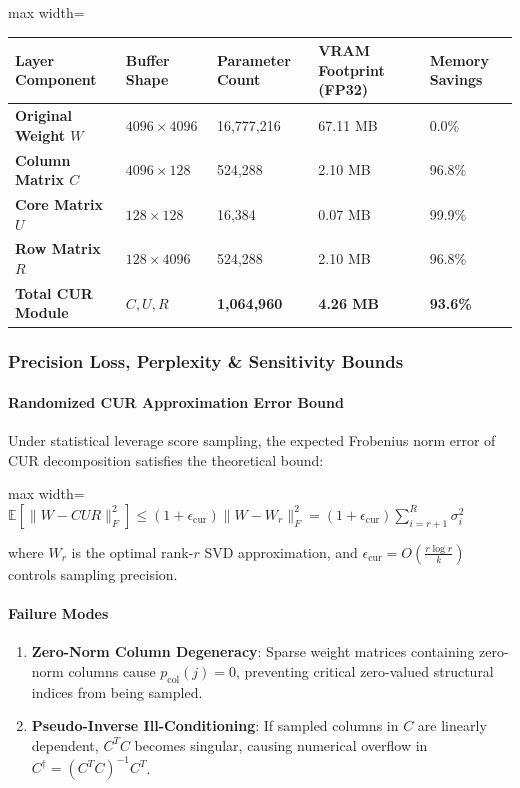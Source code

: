 \begin{center}
\begin{adjustbox}{max width=\columnwidth}
\renewcommand{\arraystretch}{1.2}
\begin{tabular}{lllll}
\toprule
Layer Component & Buffer Shape & Parameter Count & VRAM Footprint (FP32) & Memory Savings \\
\midrule
\textbf{Original Weight $W$} & $4096 \times 4096$ & 16,777,216 & 67.11 MB & 0.0\% \\
\textbf{Column Matrix $C$} & $4096 \times 128$ & 524,288 & 2.10 MB & 96.8\% \\
\textbf{Core Matrix $U$} & $128 \times 128$ & 16,384 & 0.07 MB & 99.9\% \\
\textbf{Row Matrix $R$} & $128 \times 4096$ & 524,288 & 2.10 MB & 96.8\% \\
\textbf{Total CUR Module} & $C, U, R$ & \textbf{1,064,960} & \textbf{4.26 MB} & \textbf{93.6\%} \\

\bottomrule
\end{tabular}
\end{adjustbox}
\end{center}

\subsubsection*{Precision Loss, Perplexity \& Sensitivity Bounds}

\paragraph{Randomized CUR Approximation Error Bound}
Under statistical leverage score sampling, the expected Frobenius norm error of CUR decomposition satisfies the theoretical bound:

\begin{center}
\begin{adjustbox}{max width=\columnwidth}
$\displaystyle
\mathbb{E}\left[ \|W - C U R\|_F^2 \right] \le (1 + \epsilon_{\text{cur}}) \|W - W_r\|_F^2 = (1 + \epsilon_{\text{cur}}) \sum_{i=r+1}^{R} \sigma_i^2
$
\end{adjustbox}
\end{center}

where $W_r$ is the optimal rank-$r$ SVD approximation, and $\epsilon_{\text{cur}} = O\left(\frac{r \log r}{k}\right)$ controls sampling precision.

\paragraph{Failure Modes}
\begin{enumerate}
\item \textbf{Zero-Norm Column Degeneracy}: Sparse weight matrices containing zero-norm columns cause $p_{\text{col}}(j) = 0$, preventing critical zero-valued structural indices from being sampled.
\item \textbf{Pseudo-Inverse Ill-Conditioning}: If sampled columns in $C$ are linearly dependent, $C^T C$ becomes singular, causing numerical overflow in $C^\dagger = (C^T C)^{-1} C^T$.


\end{enumerate}
